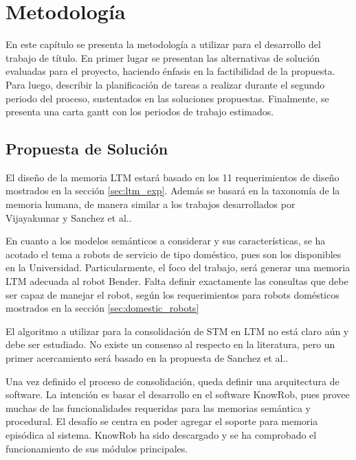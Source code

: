
\chapter{Metodolog\'ia}

En este cap\'itulo se presenta la metodolog\'ia a utilizar para el desarrollo del trabajo de t\'itulo. En primer lugar se presentan las alternativas de soluci\'on evaluadas para el proyecto, haciendo \'enfasis en la factibilidad de la propuesta. Para luego, describir la planificaci\'on de tareas a realizar durante el segundo periodo del proceso, sustentados en las soluciones propuestas. Finalmente, se presenta una carta gantt con los periodos de trabajo estimados.


\section{Propuesta de Soluci\'on}

%


El dise\~no de la memoria LTM estar\'a basado en los 11 requerimientos de dise\~no mostrados en la secci\'on \ref{sec:ltm_exp}. Adem\'as se basar\'a en la taxonom\'ia de la memoria humana, de manera similar a los trabajos desarrollados por Vijayakumar\cite{Vijayakumar2014} y Sanchez et al.\cite{Sanchez:2015}.

En cuanto a los modelos sem\'anticos a considerar y sus caracter\'isticas, se ha acotado el tema a robots de servicio de tipo dom\'estico, pues son los disponibles en la Universidad. Particularmente, el foco del trabajo, ser\'a generar una memoria LTM adecuada al robot Bender. Falta definir exactamente las consultas que debe ser capaz de manejar el robot, seg\'un los requerimientos para robots dom\'esticos mostrados en la secci\'on \ref{sec:domestic_robots}

El algoritmo a utilizar para la consolidaci\'on de STM en LTM no est\'a claro a\'un y debe ser estudiado. No existe un consenso al respecto en la literatura, pero un primer acercamiento ser\'a basado en la propuesta de Sanchez et al.\cite{Sanchez:2015}.

Una vez definido el proceso de consolidaci\'on, queda definir una arquitectura de software. La intenci\'on es basar el desarrollo en el software KnowRob, pues provee muchas de las funcionalidades requeridas para las memorias sem\'antica y procedural. El desaf\'io se centra en poder agregar el soporte para memoria epis\'odica al sistema. KnowRob ha sido descargado y se ha comprobado el funcionamiento de sus m\'odulos principales.

